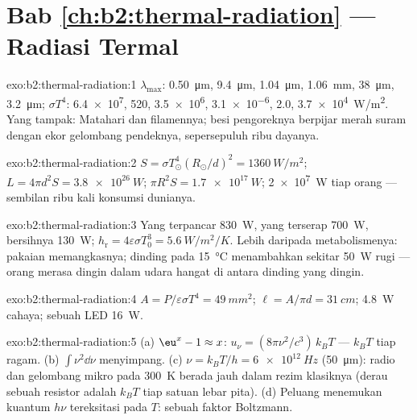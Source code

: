 \section*{Bab \ref{ch:b2:thermal-radiation} --- Radiasi Termal}

\begin{solution}{exo:b2:thermal-radiation:1}
$\lambda_{\max}$: \qty{0.50}{\micro m}, \qty{9.4}{\micro m}, \qty{1.04}{\micro m},
\qty{1.06}{mm}, \qty{38}{\micro m}, \qty{3.2}{\micro m}; $\sigma T^4$: \qty{6.4e7}{},
\qty{520}{}, \qty{3.5e6}{}, \qty{3.1e-6}{}, \qty{2.0}{}, \qty{3.7e4}{W/m^2}. Yang tampak:
Matahari dan filamennya; besi pengoreknya berpijar merah suram dengan ekor
gelombang pendeknya, sepersepuluh ribu dayanya.
\end{solution}

\begin{solution}{exo:b2:thermal-radiation:2}
$S = \sigma T_\odot^4(R_\odot/d)^2 = \qty{1360}{W/m^2}$; $L = 4\pi d^2S =
\qty{3.8e26}{W}$; $\pi R^2S = \qty{1.7e17}{W}$; \qty{2e7}{W} tiap orang --- sembilan
ribu kali konsumsi dunianya.
\end{solution}

\begin{solution}{exo:b2:thermal-radiation:3}
Yang terpancar \qty{830}{W}, yang terserap \qty{700}{W}, bersihnya \qty{130}{W}; $h_{\text{r}} =
4\varepsilon\sigma T_0^3 = \qty{5.6}{W/m^2/K}$. Lebih daripada metabolismenya:
pakaian memangkasnya; dinding pada \qty{15}{\celsius} menambahkan sekitar \qty{50}{W} rugi
--- orang merasa dingin dalam udara hangat di antara dinding yang dingin.
\end{solution}

\begin{solution}{exo:b2:thermal-radiation:4}
$A = P/\varepsilon\sigma T^4 = \qty{49}{mm^2}$; $\ell = A/\pi d = \qty{31}{cm}$;
\qty{4.8}{W} cahaya; sebuah LED \qty{16}{W}.
\end{solution}

\begin{solution}{exo:b2:thermal-radiation:5}
(a) $\eu^x - 1 \approx x$: $u_\nu = (8\pi\nu^2/c^3)\,k_BT$ --- $k_BT$ tiap ragam.
(b) $\int\nu^2\dd\nu$ menyimpang. (c) $\nu = k_BT/h = \qty{6e12}{Hz}$ (\qty{50}{\micro m}):
radio dan gelombang mikro pada \qty{300}{K} berada jauh dalam rezim klasiknya (derau
sebuah resistor adalah $k_BT$ tiap satuan lebar pita). (d) Peluang
menemukan kuantum $h\nu$ tereksitasi pada $T$: sebuah faktor Boltzmann.
\end{solution}

